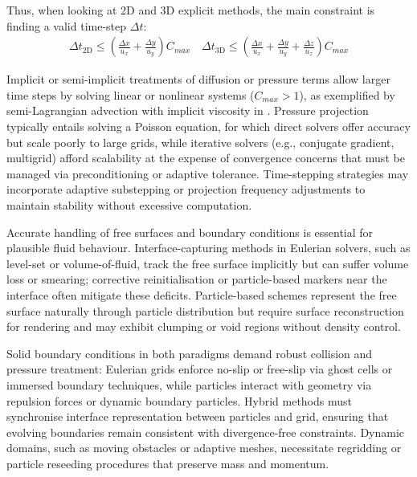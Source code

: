 Thus, when looking at 2D and 3D explicit methods, the main constraint is finding a valid time-step $\Delta t$:
\begin{align}
    \Delta t_{\text{2D}} \leq \left( \frac{\Delta x}{u_x} + \frac{\Delta y}{u_y} \right) C_{max}
    \quad
    \Delta t_{\text{3D}} \leq \left( \frac{\Delta x}{u_x} + \frac{\Delta y}{u_y} + \frac{\Delta z}{u_z} \right) C_{max}
\end{align}

Implicit or semi-implicit treatments of diffusion or pressure terms allow larger time steps by solving linear or nonlinear systems ($C_{max} > 1$), as exemplified by semi-Lagrangian advection with implicit viscosity in \cite{Stam1999}. Pressure projection typically entails solving a Poisson equation, for which direct solvers offer accuracy but scale poorly to large grids, while iterative solvers (e.g., conjugate gradient, multigrid) afford scalability at the expense of convergence concerns that must be managed via preconditioning or adaptive tolerance. Time-stepping strategies may incorporate adaptive substepping or projection frequency adjustments to maintain stability without excessive computation.

Accurate handling of free surfaces and boundary conditions is essential for plausible fluid behaviour. Interface-capturing methods in Eulerian solvers, such as level-set or volume-of-fluid, track the free surface implicitly but can suffer volume loss or smearing; corrective reinitialisation or particle-based markers near the interface often mitigate these deficits. Particle-based schemes represent the free surface naturally through particle distribution but require surface reconstruction for rendering and may exhibit clumping or void regions without density control. 

Solid boundary conditions in both paradigms demand robust collision and pressure treatment: Eulerian grids enforce no-slip or free-slip via ghost cells or immersed boundary techniques, while particles interact with geometry via repulsion forces or dynamic boundary particles. Hybrid methods must synchronise interface representation between particles and grid, ensuring that evolving boundaries remain consistent with divergence-free constraints. Dynamic domains, such as moving obstacles or adaptive meshes, necessitate regridding or particle reseeding procedures that preserve mass and momentum.


